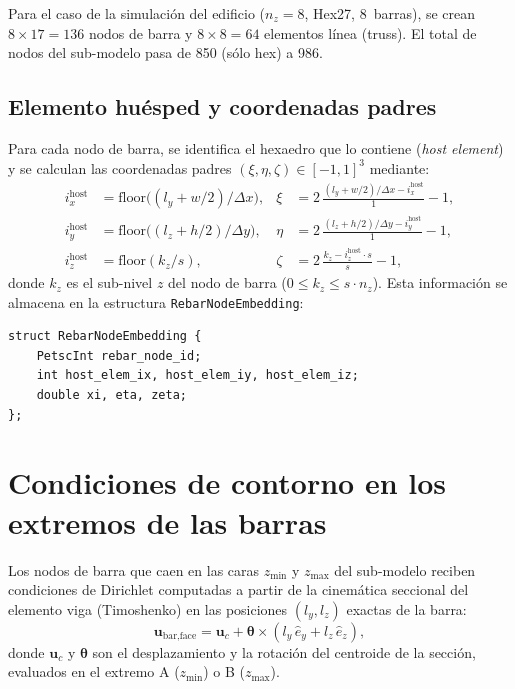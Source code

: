 Para el caso de la simulación del edificio ($n_z = 8$, Hex27,
8~barras), se crean $8 \times 17 = 136$ nodos de barra y $8 \times 8
= 64$ elementos línea (truss).  El total de nodos del sub-modelo pasa
de 850 (sólo hex) a 986.

\subsection{Elemento huésped y coordenadas padres}

Para cada nodo de barra, se identifica el hexaedro que lo contiene
(\emph{host element}) y se calculan las coordenadas padres
$(\xi, \eta, \zeta) \in [-1,1]^3$ mediante:
%
\begin{align}
  i_x^{\text{host}} &= \text{floor}\!\!\bigl((l_y + w/2) / \Delta x\bigr),
  &\xi  &= 2\,\frac{(l_y + w/2)/\Delta x - i_x^{\text{host}}}{1} - 1, \\[4pt]
  i_y^{\text{host}} &= \text{floor}\!\!\bigl((l_z + h/2) / \Delta y\bigr),
  &\eta &= 2\,\frac{(l_z + h/2)/\Delta y - i_y^{\text{host}}}{1} - 1, \\[4pt]
  i_z^{\text{host}} &= \text{floor}(k_z / s),
  &\zeta &= 2\,\frac{k_z - i_z^{\text{host}} \cdot s}{s} - 1,
\end{align}
%
donde $k_z$ es el sub-nivel $z$ del nodo de barra ($0 \le k_z \le s
\cdot n_z$).  Esta información se almacena en la estructura
\texttt{RebarNodeEmbedding}:

\begin{verbatim}
struct RebarNodeEmbedding {
    PetscInt rebar_node_id;
    int host_elem_ix, host_elem_iy, host_elem_iz;
    double xi, eta, zeta;
};
\end{verbatim}


\section{Condiciones de contorno en los extremos de las barras}
\label{sec:emb-bc}

Los nodos de barra que caen en las caras $z_{\min}$ y $z_{\max}$ del
sub-modelo reciben condiciones de Dirichlet computadas a partir de la
cinemática seccional del elemento viga (Timoshenko) en las posiciones
$(l_y, l_z)$ exactas de la barra:
%
\begin{equation}
  \mathbf{u}_{\text{bar},\text{face}} =
    \mathbf{u}_c + \boldsymbol{\theta} \times (l_y\,\hat{e}_y +
      l_z\,\hat{e}_z),
\end{equation}
%
donde $\mathbf{u}_c$ y $\boldsymbol{\theta}$ son el desplazamiento y
la rotación del centroide de la sección, evaluados en el extremo A
($z_{\min}$) o B ($z_{\max}$).

